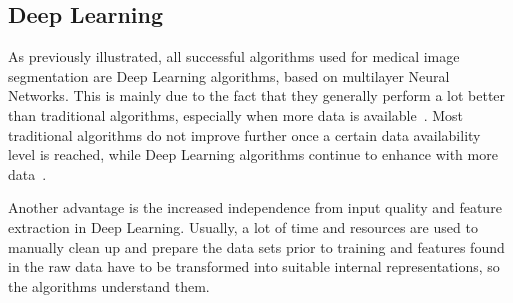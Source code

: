 \subsection{Deep Learning}\label{subsec:deep-learning}
As previously illustrated, all successful algorithms used for medical image segmentation are Deep Learning algorithms, based on multilayer Neural Networks.
This is mainly due to the fact that they generally perform a lot better than traditional algorithms, especially when more data is available~\autocite{Mathew2021}.
Most traditional algorithms do not improve further once a certain data availability level is reached, while Deep Learning algorithms continue to enhance with more data~\autocite{Mathew2021}.

Another advantage is the increased independence from input quality and feature extraction in Deep Learning.
Usually, a lot of time and resources are used to manually clean up and prepare the data sets prior to training and features found in the raw data have to be transformed into suitable internal representations, so the algorithms understand them.

